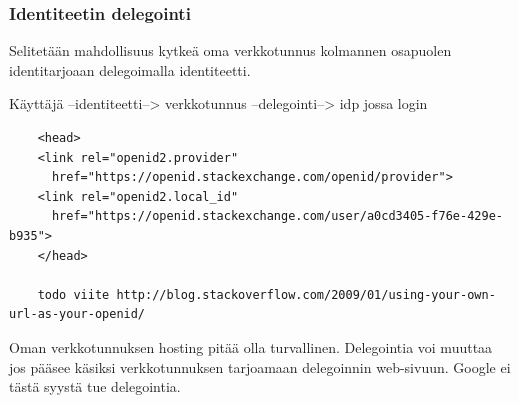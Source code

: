 \documentclass[finnish,gradu]{tktltiki}
\begin{document}

  \subsubsection{Identiteetin delegointi} %
  \label{ssub:identiteetin_delegointi}

  Selitetään mahdollisuus kytkeä oma verkkotunnus kolmannen osapuolen identitarjoaan delegoimalla identiteetti.

  Käyttäjä --identiteetti--> verkkotunnus --delegointi--> idp jossa login

  \begin{verbatim}
    <head>
    <link rel="openid2.provider"
      href="https://openid.stackexchange.com/openid/provider">
    <link rel="openid2.local_id"
      href="https://openid.stackexchange.com/user/a0cd3405-f76e-429e-b935">
    </head>

    todo viite http://blog.stackoverflow.com/2009/01/using-your-own-url-as-your-openid/
  \end{verbatim}

  Oman verkkotunnuksen hosting pitää olla turvallinen. Delegointia voi muuttaa jos pääsee käsiksi verkkotunnuksen tarjoamaan delegoinnin web-sivuun.
  Google ei tästä syystä tue delegointia.




\end{document}
